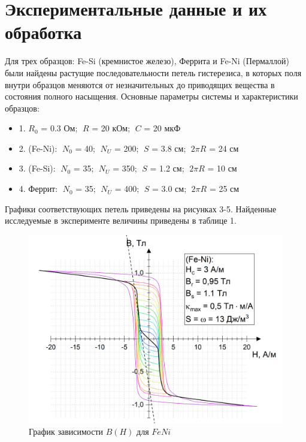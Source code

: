 \documentclass[a4paper]{article}%
\begin{document}
\section*{Экспериментальные данные и их обработка}
Для трех образцов: Fe-Si (кремнистое железо), Феррита и Fe-Ni (Пермаллой) были найдены растущие последовательности петель гистерезиса, в которых поля внутри образцов меняются от незначительных до приводящих вещества в состояния полного насыщения. Основные параметры системы и характеристики образцов:
\begin{itemize}
	\item 1. $R_0$ = 0.3 Ом; $\;R$ = 20 кОм; $\;C$ = 20 мкФ
	\item 2. (Fe-Ni): $\;N_0$ = 40; $\;N_U$ = 200; $\;S$ = 3.8 см; $\;2\pi R$ = 24 см
	\item 3. (Fe-Si): $\;N_0$ = 35; $\;N_U$ = 350; $\;S$ = 1.2 см; $\;2\pi R$ = 10 см
	\item 4. Феррит: $\;N_0$ = 35; $\;N_U$ = 400; $\;S$ = 3.0 см; $\;2\pi R$ = 25 см	
\end{itemize}
Графики соответствующих петель приведены на рисунках 3-5. Найденные исследуемые в эксперименте величины приведены в таблице 1.
\newpage
\begin{figure}[h!]
	\vspace{-1.7cm}
	\hspace{-1cm}
	\includegraphics[width=1.05\textwidth]{FeNi.png}
	\vspace{-0.7cm}
	\caption{График зависимости $B(H)$ для $FeNi$}
		\vspace{-0.85cm}
\end{figure}
\end{document}
